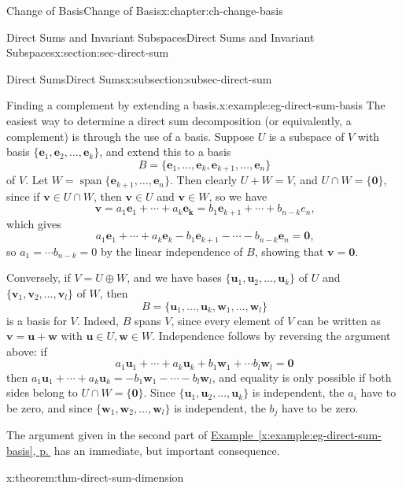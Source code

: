 \documentclass[oneside,10pt,]{book}
\newcommand{\xreffont}{\relax}
\numberwithin{equation}{section}
\newcommand{\spn}{\operatorname{span}}
\newcommand{\uu}{\mathbf{u}}
\newcommand{\vv}{\mathbf{v}}
\newcommand{\ww}{\mathbf{w}}
\newcommand{\zer}{\mathbf{0}}
\newcommand{\basis}[2]{\{\mathbf{#1}_1,\mathbf{#1}_2,\ldots,\mathbf{#1}_{#2}\}}
\begin{document}
\begin{chapterptx}{Change of Basis}{}{Change of Basis}{}{}{x:chapter:ch-change-basis}
\begin{sectionptx}{Direct Sums and Invariant Subspaces}{}{Direct Sums and Invariant Subspaces}{}{}{x:section:sec-direct-sum}
\begin{subsectionptx}{Direct Sums}{}{Direct Sums}{}{}{x:subsection:subsec-direct-sum}
\begin{example}{Finding a complement by extending a basis.}{x:example:eg-direct-sum-basis}%
The easiest way to determine a direct sum decomposition (or equivalently, a complement) is through the use of a basis. Suppose \(U\) is a subspace of \(V\) with basis \(\basis{e}{k}\), and extend this to a basis%
\begin{equation*}
B = \{\mathbf{e}_1,\ldots, \mathbf{e}_k,\mathbf{e}_{k+1},\ldots, \mathbf{e}_n\}
\end{equation*}
of \(V\). Let \(W = \spn\{\mathbf{e}_{k+1},\ldots, \mathbf{e}_n\}\). Then clearly \(U+W=V\), and \(U\cap W=\{\zer\}\), since if \(\vv\in U\cap W\), then \(\vv\in U\) and \(\vv\in W\), so we have%
\begin{equation*}
\vv = a_1\mathbf{e}_1+\cdots + a_k\mathbf{e_k} = b_1\mathbf{e}_{k+1}+\cdots+b_{n-k}e_{n}\text{,}
\end{equation*}
which gives%
\begin{equation*}
a_1\mathbf{e}_1+\cdots + a_k\mathbf{e}_k-b_1\mathbf{e}_{k+1}-\cdots - b_{n-k}\mathbf{e}_n=\zer\text{,}
\end{equation*}
so \(a_1=\cdots b_{n-k}=0\) by the linear independence of \(B\), showing that \(\vv=\zer\).%
\par
Conversely, if \(V=U\oplus W\), and we have bases \(\basis{u}{k}\) of \(U\) and \(\basis{v}{l}\) of \(W\), then%
\begin{equation*}
B = \{\uu_1,\ldots, \uu_k,\ww_1,\ldots, \ww_l\}
\end{equation*}
is a basis for \(V\). Indeed, \(B\) spans \(V\), since every element of \(V\) can be written as \(\vv=\uu+\ww\) with \(\uu\in U,\ww\in W\). Independence follows by reversing the argument above: if%
\begin{equation*}
a_1\uu_1+\cdots + a_k\uu_k+b_1\ww_1+\cdots b_l\ww_l=\zer
\end{equation*}
then \(a_1\uu_1+\cdots + a_k\uu_k = -b_1\ww_1-\cdots -b_l\ww_l\), and equality is only possible if both sides belong to \(U\cap W = \{\zer\}\). Since \(\basis{u}{k}\) is independent, the \(a_i\) have to be zero, and since \(\basis{w}{l}\) is independent, the \(b_j\) have to be zero.%
\end{example}
The argument given in the second part of \hyperref[x:example:eg-direct-sum-basis]{Example~{\xreffont\ref{x:example:eg-direct-sum-basis}}, p.\,\pageref{x:example:eg-direct-sum-basis}} has an immediate, but important consequence.%
\begin{theorem}{}{}{x:theorem:thm-direct-sum-dimension}%

\end{theorem}
\end{subsectionptx}
\end{sectionptx}
\end{chapterptx}
\end{document}
